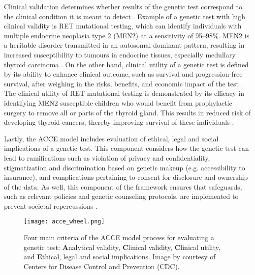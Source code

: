 Clinical validation determines whether results of the genetic test correspond to the clinical condition it is meant to detect \cite{Sanderson2005, Zimmern2007}. Example of a genetic test with high clinical validity is \acs{RET} mutational testing, which can identify individuals with multiple endocrine neoplasia type 2 (\acs{MEN2}) at a sensitivity of 95--98\%. MEN2 is a heritable disorder transmitted in an autosomal dominant pattern, resulting in increased susceptibility to tumours in endocrine tissues, especially medullary thyroid carcinoma \cite{Burke2014}. On the other hand, clinical utility of a genetic test is defined by its ability to enhance clinical outcome, such as survival and progression-free survival, after weighing in the risks, benefits, and economic impact of the test \cite{Sanderson2005, Zimmern2007}. The clinical utility of \acs{RET} mutational testing is demonstrated by its efficacy in identifying MEN2 susceptible children who would benefit from prophylactic surgery to remove all or parts of the thyroid gland. This results in reduced risk of developing thyroid cancers, thereby improving survival of these individuals \cite{Burke2014}.

Lastly, the ACCE model includes evaluation of ethical, legal and social implications of a genetic test. This component considers how the genetic test can lead to ramifications such as violation of privacy and confidentiality, stigmatization and discrimination based on genetic makeup (e.g. accessibility to insurance), and complications pertaining to consent for disclosure and ownership of the data. As well, this component of the framework ensures that safeguards, such as relevant policies and genetic counseling protocols, are implemented to prevent societal repercussions \cite{Sanderson2005, Zimmern2007}.


\begin{figure}[H]
	\centering
	\texttt{[image: acce\_wheel.png]}
	\caption[Four main criteria of the ACCE model process for evaluating a genetic test: \textbf{A}nalytical validity, \textbf{C}linical validity, \textbf{C}linical utility, and \textbf{E}thical, legal and social implications.]{Four main criteria of the ACCE model process for evaluating a genetic test: \textbf{A}nalytical validity, \textbf{C}linical validity, \textbf{C}linical utility, and \textbf{E}thical, legal and social implications. Image by courtesy of Centers for Disease Control and Prevention (\acs{CDC}).}
	\label{fig:acce_wheel}
\end{figure}

